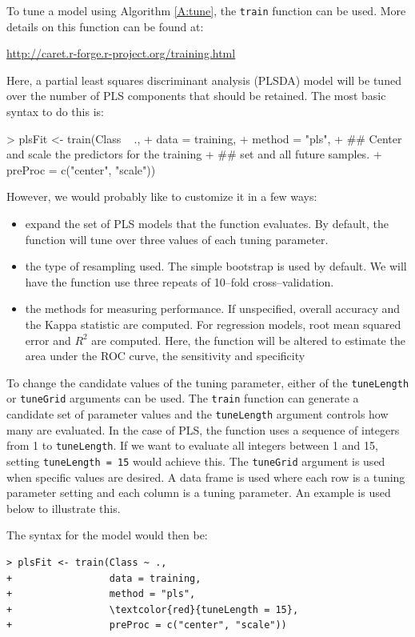 \documentclass[12pt]{article}
\newcommand{\code}[1]{\mbox{\footnotesize\color{darkblue}\texttt{#1}}}
\renewenvironment{Schunk}{\vspace{\topsep}}{\vspace{\topsep}}
\begin{document}
To tune a model using Algorithm \ref{A:tune}, the \code{train} function can be used. More details on this function can be found at:
\begin{center}
\url{http://caret.r-forge.r-project.org/training.html}
\end{center}
Here, a partial least squares discriminant analysis (PLSDA) model will be tuned over the number of PLS components that should be retained. The most basic syntax to do this is:
\begin{Schunk}
\begin{Sinput}
> plsFit <- train(Class ~ ., 
+                 data = training,
+                 method = "pls",
+                 ## Center and scale the predictors for the training 
+                 ## set and all future samples.
+                 preProc = c("center", "scale"))
\end{Sinput}
\end{Schunk}
However, we would probably like to customize it in a few ways:
\begin{itemize}
\item expand the set of PLS models that the function evaluates. By default, the function will tune over three values of each tuning parameter. 
\item the type of resampling used. The simple bootstrap is used by default. We will have the function use three repeats of 10--fold cross--validation.
\item the methods for measuring performance. If unspecified, overall accuracy and the Kappa statistic are computed. For regression models, root mean squared error and $R^2$ are computed. Here, the function will be altered to estimate the area under the ROC curve, the sensitivity and specificity 
\end{itemize}
To change the candidate values of the tuning parameter, either of the \code{tuneLength} or \code{tuneGrid} arguments can be used. The \code{train} function can generate a candidate set of parameter values and the \code{tuneLength} argument controls how many are evaluated. In the case of PLS, the function uses a sequence of integers from 1 to \code{tuneLength}. If we want to evaluate all integers between 1 and 15, setting \code{tuneLength = 15} would achieve this. The \code{tuneGrid} argument is used when specific values are desired. A data frame is used where each row is a tuning parameter setting and each column is a tuning parameter. An example is used below to illustrate this. 

The syntax for the model would then be:
\begin{Verbatim}[fontshape=sl,formatcom=\color{darkblue},fontsize=\footnotesize,commandchars=\\\{\}]
> plsFit <- train(Class ~ ., 
+                 data = training,
+                 method = "pls",
+                 \textcolor{red}{tuneLength = 15},
+                 preProc = c("center", "scale"))                     
\end{Verbatim}
\end{document}
